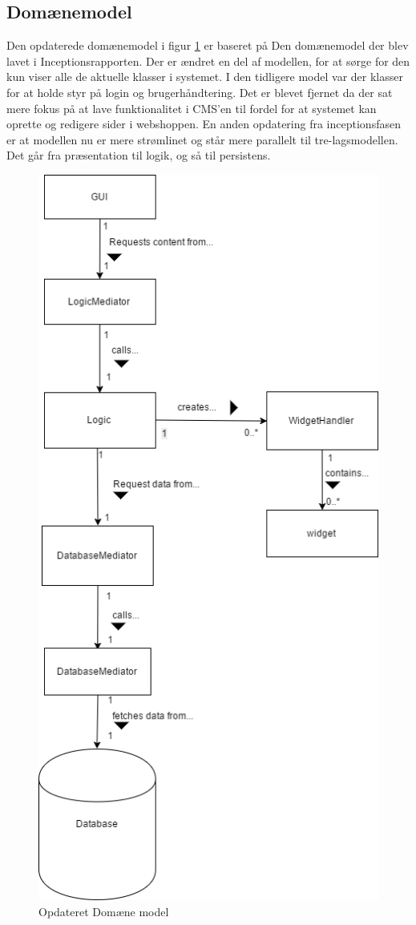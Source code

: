\subsection{Domænemodel}
  Den opdaterede domænemodel i figur \ref{fig:updatedDomainModel} er baseret på Den domænemodel der blev lavet i Inceptionsrapporten. Der er ændret en del af modellen, for at sørge for den kun viser alle de aktuelle klasser i systemet. I den tidligere model var der klasser for at holde styr på login og brugerhåndtering. Det er blevet fjernet da der sat mere fokus på at lave funktionalitet i CMS'en til fordel for at systemet kan oprette og redigere sider i webshoppen.
En anden opdatering fra inceptionsfasen er at modellen nu er mere strømlinet og står mere parallelt til tre-lagsmodellen. Det går fra præsentation til logik, og så til persistens.

\begin{figure}[H]
	\includegraphics[height=\textheight]{elaborationsdokumentet/figurer/updated_domain_Diagram.png}
    \caption{Opdateret Domæne model}
    \label{fig:updatedDomainModel}
\end{figure}

